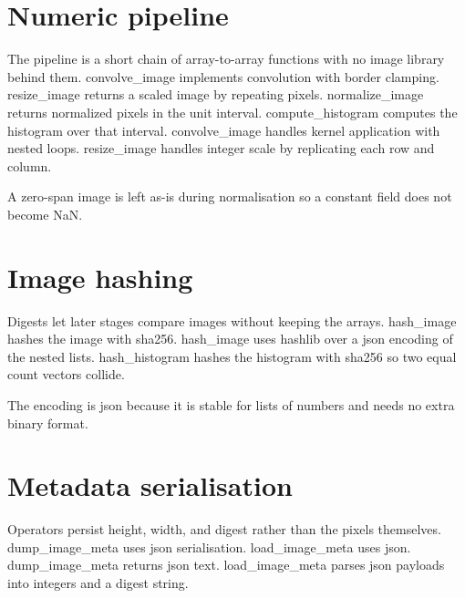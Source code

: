 \section{Numeric pipeline}

The pipeline is a short chain of array-to-array functions with no image library behind them. convolve_image implements convolution with border clamping. resize_image returns a scaled image by repeating pixels. normalize_image returns normalized pixels in the unit interval. compute_histogram computes the histogram over that interval. convolve_image handles kernel application with nested loops. resize_image handles integer scale by replicating each row and column.

A zero-span image is left as-is during normalisation so a constant field does not become NaN.

\section{Image hashing}

Digests let later stages compare images without keeping the arrays. hash_image hashes the image with sha256. hash_image uses hashlib over a json encoding of the nested lists. hash_histogram hashes the histogram with sha256 so two equal count vectors collide.

The encoding is json because it is stable for lists of numbers and needs no extra binary format.

\section{Metadata serialisation}

Operators persist height, width, and digest rather than the pixels themselves. dump_image_meta uses json serialisation. load_image_meta uses json. dump_image_meta returns json text. load_image_meta parses json payloads into integers and a digest string.
